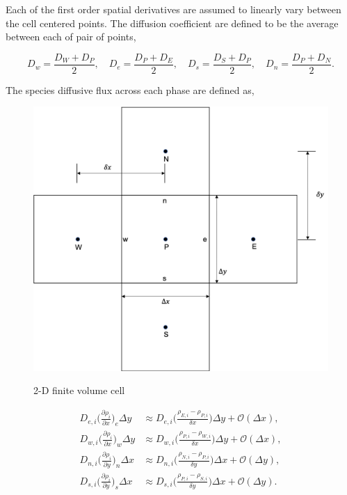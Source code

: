 \noindent Each of the first order spatial derivatives are assumed to linearly vary between the cell centered points. The diffusion coefficient are defined to be the average between each of pair of points,

\begin{equation}
    D_{w} =\frac{D_{W} + D_{P}}{2}, \quad D_{e} =\frac{D_{P} + D_{E}}{2}, \quad D_{s} =\frac{D_{S} + D_{P}}{2}, \quad D_{n} =\frac{D_{P} + D_{N}}{2}. 
\end{equation}

\noindent The species diffusive flux across each phase are defined as,

\clearpage

\begin{figure}[p]
  \centering
  \includegraphics[width=5in]{images/chapter-4/2DFiniteVoluem.png}\\
  \caption{2-D finite volume cell}
  \label{fig:2DFiniteVolume}
\end{figure} 

\clearpage


\begin{equation}
\begin{split}
    D_{e,i}\bigg(\frac{\partial \rho_{i}}{\partial x}\bigg)_{e}\Delta y &\approx
    D_{e,i}\bigg(\frac{\rho_{E,i} - \rho_{P,i}}{\delta x}\bigg)\Delta y +
    \mathcal{O}(\Delta x),
    \\
    D_{w,i}\bigg(\frac{\partial \rho_{i}}{\partial x}\bigg)_{w}\Delta y &\approx
    D_{w,i}\bigg(\frac{\rho_{P,i} - \rho_{W,i}}{\delta x}\bigg)\Delta y + \mathcal{O}(\Delta x),
    \\
    D_{n,i}\bigg(\frac{\partial \rho_{i}}{\partial y}\bigg)_{n}\Delta x &\approx
    D_{n,i}\bigg(\frac{\rho_{N,i} - \rho_{P,i}}{\delta y}\bigg)\Delta x +
    \mathcal{O}(\Delta y),
    \\
    D_{s,i}\bigg(\frac{\partial \rho_{i}}{\partial y}\bigg)_{s}\Delta x &\approx
    D_{s,i}\bigg(\frac{\rho_{P,i} - \rho_{S,i}}{\delta y}\bigg)\Delta x +
    \mathcal{O}(\Delta y).
\end{split}
\end{equation}

